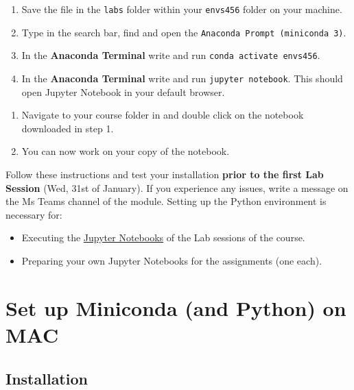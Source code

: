 \documentclass[
  letterpaper,
  DIV=11,
  numbers=noendperiod]{scrreprt}
\providecommand{\tightlist}{%
  \setlength{\itemsep}{0pt}\setlength{\parskip}{0pt}}\usepackage{longtable,booktabs,array}
\begin{document}
\begin{enumerate}
\def\labelenumi{\arabic{enumi}.}
\setcounter{enumi}{1}
\tightlist
\item
  Save the file in the \texttt{labs} folder within your \texttt{envs456}
  folder on your machine.
\item
  Type in the search bar, find and open the
  \texttt{Anaconda\ Prompt\ (miniconda\ 3)}.
\item
  In the \textbf{Anaconda Terminal} write and run
  \texttt{conda\ activate\ envs456}.
\item
  In the \textbf{Anaconda Terminal} write and run
  \texttt{jupyter\ notebook}. This should open Jupyter Notebook in your
  default browser.
\end{enumerate}

\begin{enumerate}
\def\labelenumi{\arabic{enumi}.}
\setcounter{enumi}{5}
\tightlist
\item
  Navigate to your course folder in and double click on the notebook
  downloaded in step 1.
\item
  You can now work on your copy of the notebook.
\end{enumerate}

Follow these instructions and test your installation \textbf{prior to
the first Lab Session} (Wed, 31st of January). If you experience any
issues, write a message on the Ms Teams channel of the module. Setting
up the Python environment is necessary for:

\begin{itemize}
\tightlist
\item
  Executing the \href{https://docs.jupyter.org/en/latest/}{Jupyter
  Notebooks} of the Lab sessions of the course.
\item
  Preparing your own Jupyter Notebooks for the assignments (one each).
\end{itemize}

\section*{Set up Miniconda (and Python) on
MAC}\label{set-up-miniconda-and-python-on-mac}


\subsection*{Installation}\label{installation-1}
\end{document}
